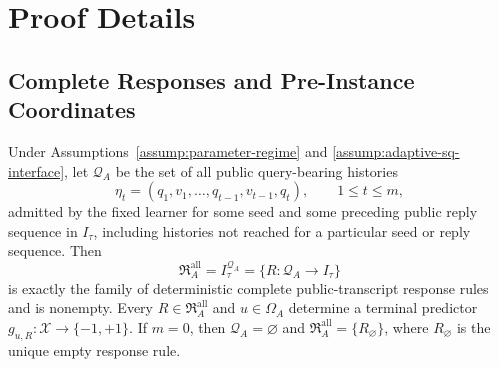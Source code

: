 \appendix

\section{Proof Details}

\subsection{Complete Responses and Pre-Instance Coordinates}
\label{app:step-001}

\begin{lemma}
\label{lem:step-001-complete-rules}
Under Assumptions~\ref{assump:parameter-regime} and
\ref{assump:adaptive-sq-interface}, let \(\mathscr Q_A\) be the set of all
public query-bearing histories
\[
\eta_t=(q_1,v_1,\ldots,q_{t-1},v_{t-1},q_t),
\qquad 1\le t\le m,
\]
admitted by the fixed learner for some seed and some preceding public reply
sequence in \(I_\tau\), including histories not reached for a particular seed
or reply sequence.  Then
\[
\mathfrak R_A^{\mathrm{all}}=I_\tau^{\mathscr Q_A}
=\{R:\mathscr Q_A\to I_\tau\}
\]
is exactly the family of deterministic complete public-transcript response
rules and is nonempty.  Every \(R\in\mathfrak R_A^{\mathrm{all}}\) and
\(u\in\Omega_A\) determine a terminal predictor
\(g_{u,R}:\mathcal X\to\{-1,+1\}\).  If \(m=0\), then
\(\mathscr Q_A=\varnothing\) and
\(\mathfrak R_A^{\mathrm{all}}=\{R_\varnothing\}\), where
\(R_\varnothing\) is the unique empty response rule.
\end{lemma}

